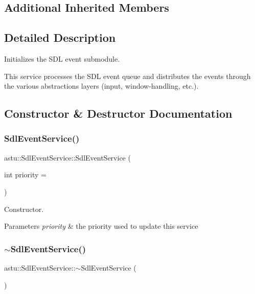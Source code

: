 \subsection*{Additional Inherited Members}


\subsection{Detailed Description}
Initializes the S\+DL event submodule.

This service processes the S\+DL event queue and distributes the events through the various abstractions layers (input, window-\/handling, etc.). 

\subsection{Constructor \& Destructor Documentation}
\mbox{\label{classastu_1_1SdlEventService_ad8da3cc63eb9810ba27a80bfeb68122d}} 
\subsubsection{\texorpdfstring{Sdl\+Event\+Service()}{SdlEventService()}}
{\footnotesize\ttfamily astu\+::\+Sdl\+Event\+Service\+::\+Sdl\+Event\+Service (\begin{DoxyParamCaption}\item[{int}]{priority = {} }\end{DoxyParamCaption})}

Constructor.


\begin{DoxyParams}{Parameters}
{\em priority} & the priority used to update this service \\
\hline
\end{DoxyParams}
\mbox{\label{classastu_1_1SdlEventService_a388605cdc2ed3eb6fc70d2a020047552}} 
\subsubsection{\texorpdfstring{$\sim$\+Sdl\+Event\+Service()}{~SdlEventService()}}
{\footnotesize\ttfamily astu\+::\+Sdl\+Event\+Service\+::$\sim$\+Sdl\+Event\+Service (\begin{DoxyParamCaption}{ }\end{DoxyParamCaption})\hspace{0.3cm}{\ttfamily [inline]}}

